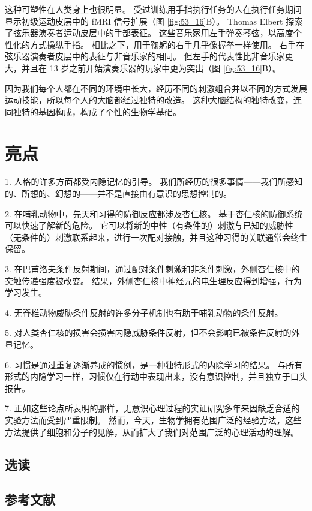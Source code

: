 这种可塑性在人类身上也很明显。 受过训练用手指执行任务的人在执行任务期间显示初级运动皮层中的 fMRI 信号扩展（图 \ref{fig:53_16}B）。 Thomas Elbert 探索了弦乐器演奏者运动皮层中的手部表征。 这些音乐家用左手弹奏琴弦，以高度个性化的方式操纵手指。 相比之下，用于鞠躬的右手几乎像握拳一样使用。 右手在弦乐器演奏者皮层中的表征与非音乐家的相同。 但左手的代表性比非音乐家更大，并且在 13 岁之前开始演奏乐器的玩家中更为突出（图 \ref{fig:53_16}B）。

因为我们每个人都在不同的环境中长大，经历不同的刺激组合并以不同的方式发展运动技能，所以每个人的大脑都经过独特的改造。 这种大脑结构的独特改变，连同独特的基因构成，构成了个性的生物学基础。


\section{亮点}
1. 人格的许多方面都受内隐记忆的引导。 我们所经历的很多事情——我们所感知的、所想的、幻想的——并不是直接由有意识的思想控制的。 

2. 在哺乳动物中，先天和习得的防御反应都涉及杏仁核。 基于杏仁核的防御系统可以快速了解新的危险。 它可以将新的中性（有条件的）刺激与已知的威胁性（无条件的）刺激联系起来，进行一次配对接触，并且这种习得的关联通常会终生保留。 

3. 在巴甫洛夫条件反射期间，通过配对条件刺激和非条件刺激，外侧杏仁核中的突触传递强度被改变。 结果，外侧杏仁核中神经元的电生理反应得到增强，行为学习发生。 

4. 无脊椎动物威胁条件反射的许多分子机制也有助于哺乳动物的条件反射。 

5. 对人类杏仁核的损害会损害内隐威胁条件反射，但不会影响已被条件反射的外显记忆。 

6. 习惯是通过重复逐渐养成的惯例，是一种独特形式的内隐学习的结果。 与所有形式的内隐学习一样，习惯仅在行动中表现出来，没有意识控制，并且独立于口头报告。 

7. 正如这些论点所表明的那样，无意识心理过程的实证研究多年来因缺乏合适的实验方法而受到严重限制。 然而，今天，生物学拥有范围广泛的经验方法，这些方法提供了细胞和分子的见解，从而扩大了我们对范围广泛的心理活动的理解。

\subsection{选读}
\subsection{参考文献}